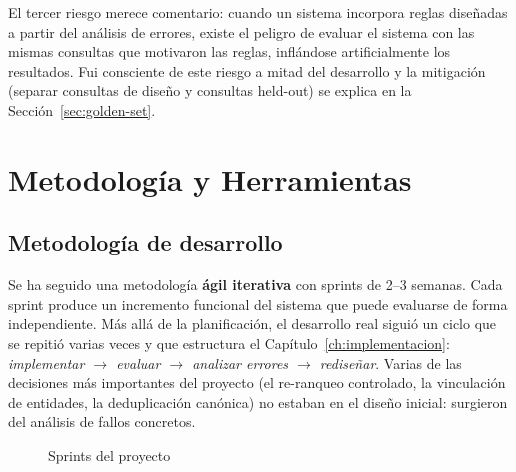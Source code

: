 \documentclass[12pt, a4paper, twoside]{report}
\begin{document}
El tercer riesgo merece comentario: cuando un sistema incorpora reglas dise\~nadas a partir del an\'alisis de errores, existe el peligro de evaluar el sistema con las mismas consultas que motivaron las reglas, infl\'andose artificialmente los resultados. Fui consciente de este riesgo a mitad del desarrollo y la mitigaci\'on (separar consultas de dise\~no y consultas held-out) se explica en la Secci\'on~\ref{sec:golden-set}.


\chapter{Metodolog\'ia y Herramientas}
\label{ch:metodologia}

\section{Metodolog\'ia de desarrollo}

Se ha seguido una metodolog\'ia \textbf{\'agil iterativa} con sprints de 2--3 semanas. Cada sprint produce un incremento funcional del sistema que puede evaluarse de forma independiente. M\'as all\'a de la planificaci\'on, el desarrollo real sigui\'o un ciclo que se repiti\'o varias veces y que estructura el Cap\'itulo~\ref{ch:implementacion}: \textit{implementar $\rightarrow$ evaluar $\rightarrow$ analizar errores $\rightarrow$ redise\~nar}. Varias de las decisiones m\'as importantes del proyecto (el re-ranqueo controlado, la vinculaci\'on de entidades, la deduplicaci\'on can\'onica) no estaban en el dise\~no inicial: surgieron del an\'alisis de fallos concretos.

\begin{figure}[H]
\centering
{}
\caption{Sprints del proyecto}
\label{fig:sprints}
\end{figure}
\end{document}
